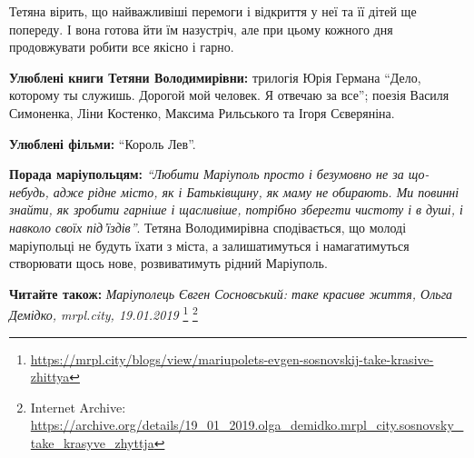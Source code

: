 Тетяна вірить, що найважливіші перемоги і відкриття у неї та її дітей ще
попереду. І вона готова йти їм назустріч, але при цьому кожного дня
продовжувати робити все якісно і гарно.


\textbf{Улюблені книги Тетяни Володимирівни:} трилогія Юрія Германа \enquote{Дело,
которому ты служишь. Дорогой мой человек. Я отвечаю за все}; поезія Василя
Симоненка, Ліни Костенко, Максима Рильського та Ігоря Сєверяніна.

\textbf{Улюблені фільми:} \enquote{Король Лев}.

\textbf{Порада маріупольцям:} \emph{\enquote{Любити Маріуполь просто і безумовно не за
що-небудь, адже рідне місто, як і Батьківщину, як маму не обирають. Ми повинні
знайти, як зробити гарніше і щасливіше, потрібно зберегти чистоту і в душі, і
навколо своїх під'їздів}}. Тетяна Володимирівна сподівається, що молоді
маріупольці не будуть їхати з міста, а залишатимуться і намагатимуться
створювати щось нове, розвиватимуть рідний Маріуполь.

\textbf{Читайте також:} \emph{Маріуполець Євген Сосновський: таке красиве життя, Ольга Демідко, mrpl.city, 19.01.2019}%
\footnote{\url{https://mrpl.city/blogs/view/mariupolets-evgen-sosnovskij-take-krasive-zhittya}} %
\footnote{Internet Archive: \url{https://archive.org/details/19_01_2019.olga_demidko.mrpl_city.sosnovsky_take_krasyve_zhyttja}}

